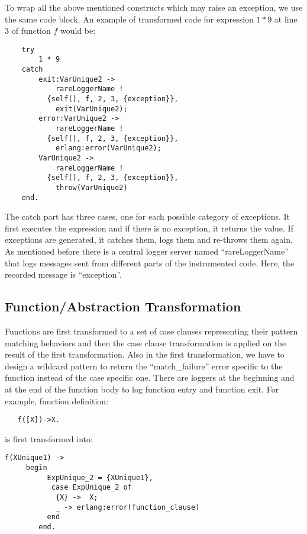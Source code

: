 \documentclass[12pt,a4paper]{report}
\begin{document}
To wrap all the above mentioned constructs which may raise an exception, we use the same code block. An example of transformed code for expression $1 * 9$  at line $3$ of function $f$ would be:
 
\begin{lstlisting}
    try 
        1 * 9 
    catch
        exit:VarUnique2 ->
            rareLoggerName ! 
	      {self(), f, 2, 3, {exception}},
            exit(VarUnique2);
        error:VarUnique2 ->
            rareLoggerName ! 
	      {self(), f, 2, 3, {exception}},
            erlang:error(VarUnique2);
        VarUnique2 ->
            rareLoggerName !
	      {self(), f, 2, 3, {exception}},
            throw(VarUnique2)
    end.
\end{lstlisting}

The catch part has three cases, one for each possible category of exceptions. It first executes the expression and if there is no exception, it returns the value. If exceptions are generated, it catches them, logs them and re-throws them again. As mentioned before there is a central logger server named ``rareLoggerName'' that logs messages sent from different parts of the instrumented code. Here, the recorded message is ``exception''. 

\subsection{Function/Abstraction Transformation}
Functions are first transformed to a set of case clauses representing their pattern matching behaviors and then the case clause transformation is applied on the result of the first transformation. Also in the first transformation, we have to design a wildcard pattern to return the ``match\_failure'' error specific to the function instead of the case specific one. There are loggers at the beginning and at the end of the function body to log function entry and function exit. For example, function definition:

\begin{lstlisting}
   f([X])->X.
\end{lstlisting}

is first transformed into:

\begin{lstlisting}
f(XUnique1) ->
     begin
          ExpUnique_2 = {XUnique1},
           case ExpUnique_2 of
            {X} ->  X;
            _ -> erlang:error(function_clause)
          end
        end.
\end{lstlisting}
\end{document}
